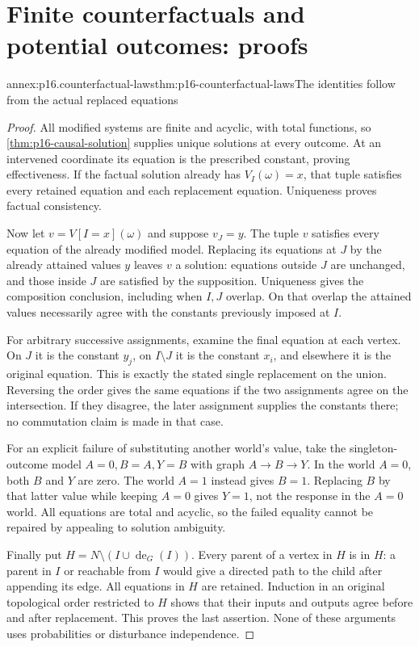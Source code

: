 \section{Finite counterfactuals and potential outcomes: proofs}
\label{sec:annex-p16-finite-counterfactuals}

\begin{annexitem}{annex:p16.counterfactual-laws}{thm:p16-counterfactual-laws}{The identities follow from the actual replaced equations}
\begin{proof}
All modified systems are finite and acyclic, with total functions, so
\cref{thm:p16-causal-solution} supplies unique solutions at every
outcome. At an intervened coordinate its equation is the prescribed
constant, proving effectiveness. If the factual solution already has
\(V_I(\omega)=x\), that tuple satisfies every retained equation
and each replacement equation. Uniqueness proves factual consistency.

Now let \(v=V[I=x](\omega)\) and suppose \(v_J=y\).
The tuple \(v\) satisfies every equation of the already modified
model. Replacing its equations at \(J\) by the already attained
values \(y\) leaves \(v\) a solution: equations outside \(J\)
are unchanged, and those inside \(J\) are satisfied by the supposition.
Uniqueness gives the composition conclusion, including when \(I,J\)
overlap. On that overlap the attained values necessarily agree with
the constants previously imposed at \(I\).

For arbitrary successive assignments, examine the final equation at
each vertex. On \(J\) it is the constant \(y_j\), on
\(I\setminus J\) it is the constant \(x_i\), and elsewhere
it is the original equation. This is exactly the stated single
replacement on the union. Reversing the order gives the same equations
if the two assignments agree on the intersection. If they disagree,
the later assignment supplies the constants there; no commutation
claim is made in that case.

For an explicit failure of substituting another world's value, take
the singleton-outcome model \(A=0,B=A,Y=B\) with graph
\(A\to B\to Y\). In the world \(A=0\), both \(B\) and
\(Y\) are zero. The world \(A=1\) instead gives \(B=1\).
Replacing \(B\) by that latter value while keeping \(A=0\)
gives \(Y=1\), not the response in the \(A=0\) world. All
equations are total and acyclic, so the failed equality cannot be
repaired by appealing to solution ambiguity.

Finally put \(H=N\setminus(I\cup\operatorname{de}_G(I))\).
Every parent of a vertex in \(H\) is in \(H\): a parent in
\(I\) or reachable from \(I\) would give a directed path to
the child after appending its edge. All equations in \(H\) are
retained. Induction in an original topological order restricted to
\(H\) shows that their inputs and outputs agree before and after
replacement. This proves the last assertion. None of these arguments
uses probabilities or disturbance independence.
\end{proof}
\end{annexitem}

